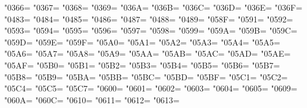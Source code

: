 \XeTeXcharclass"0366=\KclassNum
\XeTeXcharclass"0367=\KclassNum
\XeTeXcharclass"0368=\KclassNum
\XeTeXcharclass"0369=\KclassNum
\XeTeXcharclass"036A=\KclassNum
\XeTeXcharclass"036B=\KclassNum
\XeTeXcharclass"036C=\KclassNum
\XeTeXcharclass"036D=\KclassNum
\XeTeXcharclass"036E=\KclassNum
\XeTeXcharclass"036F=\KclassNum
\XeTeXcharclass"0483=\KclassNum
\XeTeXcharclass"0484=\KclassNum
\XeTeXcharclass"0485=\KclassNum
\XeTeXcharclass"0486=\KclassNum
\XeTeXcharclass"0487=\KclassNum
\XeTeXcharclass"0488=\KclassNum
\XeTeXcharclass"0489=\KclassNum
\XeTeXcharclass"058F=\KclassNum
\XeTeXcharclass"0591=\KclassNum
\XeTeXcharclass"0592=\KclassNum
\XeTeXcharclass"0593=\KclassNum
\XeTeXcharclass"0594=\KclassNum
\XeTeXcharclass"0595=\KclassNum
\XeTeXcharclass"0596=\KclassNum
\XeTeXcharclass"0597=\KclassNum
\XeTeXcharclass"0598=\KclassNum
\XeTeXcharclass"0599=\KclassNum
\XeTeXcharclass"059A=\KclassNum
\XeTeXcharclass"059B=\KclassNum
\XeTeXcharclass"059C=\KclassNum
\XeTeXcharclass"059D=\KclassNum
\XeTeXcharclass"059E=\KclassNum
\XeTeXcharclass"059F=\KclassNum
\XeTeXcharclass"05A0=\KclassNum
\XeTeXcharclass"05A1=\KclassNum
\XeTeXcharclass"05A2=\KclassNum
\XeTeXcharclass"05A3=\KclassNum
\XeTeXcharclass"05A4=\KclassNum
\XeTeXcharclass"05A5=\KclassNum
\XeTeXcharclass"05A6=\KclassNum
\XeTeXcharclass"05A7=\KclassNum
\XeTeXcharclass"05A8=\KclassNum
\XeTeXcharclass"05A9=\KclassNum
\XeTeXcharclass"05AA=\KclassNum
\XeTeXcharclass"05AB=\KclassNum
\XeTeXcharclass"05AC=\KclassNum
\XeTeXcharclass"05AD=\KclassNum
\XeTeXcharclass"05AE=\KclassNum
\XeTeXcharclass"05AF=\KclassNum
\XeTeXcharclass"05B0=\KclassNum
\XeTeXcharclass"05B1=\KclassNum
\XeTeXcharclass"05B2=\KclassNum
\XeTeXcharclass"05B3=\KclassNum
\XeTeXcharclass"05B4=\KclassNum
\XeTeXcharclass"05B5=\KclassNum
\XeTeXcharclass"05B6=\KclassNum
\XeTeXcharclass"05B7=\KclassNum
\XeTeXcharclass"05B8=\KclassNum
\XeTeXcharclass"05B9=\KclassNum
\XeTeXcharclass"05BA=\KclassNum
\XeTeXcharclass"05BB=\KclassNum
\XeTeXcharclass"05BC=\KclassNum
\XeTeXcharclass"05BD=\KclassNum
\XeTeXcharclass"05BF=\KclassNum
\XeTeXcharclass"05C1=\KclassNum
\XeTeXcharclass"05C2=\KclassNum
\XeTeXcharclass"05C4=\KclassNum
\XeTeXcharclass"05C5=\KclassNum
\XeTeXcharclass"05C7=\KclassNum
\XeTeXcharclass"0600=\KclassNum
\XeTeXcharclass"0601=\KclassNum
\XeTeXcharclass"0602=\KclassNum
\XeTeXcharclass"0603=\KclassNum
\XeTeXcharclass"0604=\KclassNum
\XeTeXcharclass"0605=\KclassNum
\XeTeXcharclass"0609=\KclassNum
\XeTeXcharclass"060A=\KclassNum
\XeTeXcharclass"060C=\KclassNum
\XeTeXcharclass"0610=\KclassNum
\XeTeXcharclass"0611=\KclassNum
\XeTeXcharclass"0612=\KclassNum
\XeTeXcharclass"0613=\KclassNum
